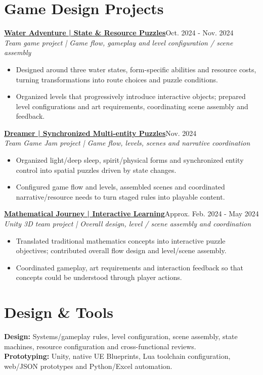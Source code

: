 \documentclass[a4paper,11pt]{article}
\newcommand{\resumeSubheading}[3]{\textbf{#1}\hfill{\small #3}\\{\small\textit{#2}}\par\vspace{3pt}}
\newcommand{\resumeItemListStart}{\begin{itemize}[leftmargin=13pt,label=\textbullet,itemsep=2.5pt,topsep=3pt,parsep=0pt]\fontsize{10.5pt}{13.2pt}\selectfont}
\newcommand{\resumeItemListEnd}{\end{itemize}\vspace{2pt}}
\newcommand{\resumeItem}[1]{\item #1}
\begin{document}
\section{Game Design Projects}
\resumeSubheading{\href{https://zukunft39.github.io/projects/water.html}{Water Adventure | State \& Resource Puzzles}}{Team game project | Game flow, gameplay and level configuration / scene assembly}{Oct. 2024 - Nov. 2024}
\resumeItemListStart
\resumeItem{Designed around three water states, form-specific abilities and resource costs, turning transformations into route choices and puzzle conditions.}
\resumeItem{Organized levels that progressively introduce interactive objects; prepared level configurations and art requirements, coordinating scene assembly and feedback.}
\resumeItemListEnd
\resumeSubheading{\href{https://zukunft39.github.io/projects/dream.html}{Dreamer | Synchronized Multi-entity Puzzles}}{Team Game Jam project | Game flow, levels, scenes and narrative coordination}{Nov. 2024}
\resumeItemListStart
\resumeItem{Organized light/deep sleep, spirit/physical forms and synchronized entity control into spatial puzzles driven by state changes.}
\resumeItem{Configured game flow and levels, assembled scenes and coordinated narrative/resource needs to turn staged rules into playable content.}
\resumeItemListEnd
\resumeSubheading{\href{https://zukunft39.github.io/projects/math.html}{Mathematical Journey | Interactive Learning}}{Unity 3D team project | Overall design, level / scene assembly and coordination}{Approx. Feb. 2024 - May 2024}
\resumeItemListStart
\resumeItem{Translated traditional mathematics concepts into interactive puzzle objectives; contributed overall flow design and level/scene assembly.}
\resumeItem{Coordinated gameplay, art requirements and interaction feedback so that concepts could be understood through player actions.}
\resumeItemListEnd
\section{Design \& Tools}
{\fontsize{10.5pt}{13.2pt}\selectfont
\textbf{Design:} Systems/gameplay rules, level configuration, scene assembly, state machines, resource configuration and cross-functional reviews.\\[2pt]
\textbf{Prototyping:} Unity, native UE Blueprints, Lua toolchain configuration, web/JSON prototypes and Python/Excel automation.\\[2pt]
}
\end{document}
